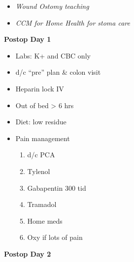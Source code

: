 \documentclass[
  letterpaper,
]{scrbook}
\providecommand{\tightlist}{%
  \setlength{\itemsep}{0pt}\setlength{\parskip}{0pt}}
\begin{document}
\begin{itemize}
\begin{itemize}
    \begin{itemize}
    \tightlist
    \item
      Prefer to resume all
    \item
      Sliding-scale insulin if needed
    \end{itemize}
  \end{itemize}
\item
  \emph{Wound Ostomy teaching}
\item
  \emph{CCM for Home Health for stoma care}
\end{itemize}

\textbf{Postop Day 1}

\begin{itemize}
\tightlist
\item
  Labs: K+ and CBC only
\item
  d/c ``pre'' plan \& colon visit
\item
  Heparin lock IV
\item
  Out of bed \textgreater{} 6 hrs
\item
  Diet: low residue
\item
  Pain management

  \begin{enumerate}
  \def\labelenumi{\arabic{enumi})}
  \tightlist
  \item
    d/c PCA
  \item
    Tylenol
  \item
    Gabapentin 300 tid
  \item
    Tramadol
  \item
    Home meds
  \item
    Oxy if lots of pain
  \end{enumerate}
\end{itemize}

\textbf{Postop Day 2}
\end{document}
